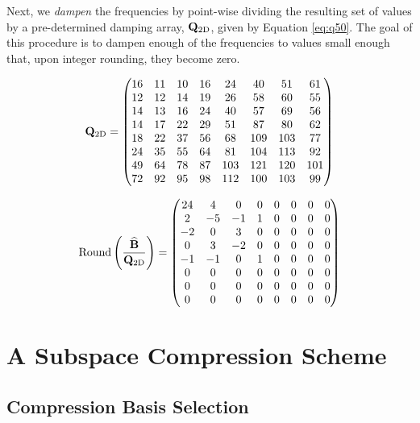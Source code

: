 Next, we {\em dampen} the frequencies by point-wise dividing the resulting set of values by a pre-determined damping array, $\mathbf{Q}_{\textrm{2D}}$, given by Equation \ref{eq:q50}. The goal of this procedure is to dampen enough of the frequencies to values small enough that, upon integer rounding, they become zero. 

\begin{equation}
\label{eq:q50}
	\mathbf{Q}_{\textrm{2D}} = \begin{pmatrix}
	16 & 11 & 10 & 16 & 24 & 40 & 51 & 61\\
	12 & 12 & 14 & 19 & 26 & 58 & 60 & 55\\
	14 & 13 & 16 & 24 & 40 & 57 & 69 & 56\\
	14 & 17 & 22 & 29 & 51 & 87 & 80 & 62\\
	18 & 22 & 37 & 56 & 68 & 109 & 103 & 77\\
	24 & 35 & 55 & 64 & 81 & 104 & 113 & 92\\
	49 & 64 & 78 & 87 & 103 & 121 & 120 & 101\\
	72 & 92 & 95 & 98 & 112 & 100 & 103 & 99	
	\end{pmatrix}
\end{equation}

\begin{equation}
	\textnormal{Round}\left(\frac{\widehat{\mathbf{B}}}{\mathbf{Q}_{\textrm{2D}}}\right) = \begin{pmatrix}
	24 &	4 &	0 &	0 &	0 &	0 &	0 &	0\\
	2 &	-5 &	-1 &	1 &	0 &	0 &	0 &	0\\
	-2 &	0 &	3 &	0 &	0 &	0 &	0 &	0\\
	0 &	3 &	-2 &	0 &	0 &	0 &	0 &	0\\
	-1 &	-1 &	0 &	1 &	0 &	0 &	0 &	0\\
	0 &	0 &	0 &	0 &	0 &	0 &	0 &	0\\
	0 &	0 &	0 &	0 &	0 &	0 &	0 &	0\\
	0 &	0 &	0 &	0 &	0 &	0 &	0 &	0
	\end{pmatrix}
\end{equation}


\section{A Subspace Compression Scheme}
\label{sec:Algorithm}

\subsection{Compression Basis Selection}
\label{sec:laplacian}

